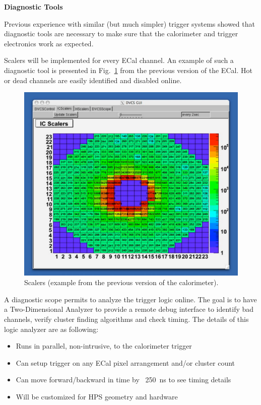 \vspace{1cm}
{\bf Diagnostic Tools}

Previous experience with similar (but much simpler) trigger systems showed that diagnostic tools are necessary to make sure that the calorimeter and trigger electronics work as expected. 

Scalers will be implemented for every ECal channel. An example of such a diagnostic tool is presented in Fig.~\ref{fig:dvcs_beam}
from the previous version of the ECal. Hot or dead channels are easily identified and disabled online.
\begin{figure}[h]
\includegraphics[scale=0.52]{daq_trigger/figures/dvcs_beam}
\caption{\small{Scalers (example from the previous version of the calorimeter).}}
\label{fig:dvcs_beam}
\end{figure}
A diagnostic scope permits to analyze the trigger logic online. The goal is to have a Two-Dimensional Analyzer
 to provide a remote debug interface to identify bad channels, verify cluster finding algorithms and check timing.
 The details of this logic analyzer are as following:
 
\begin{itemize}
\item Runs in parallel, non-intrusive, to the calorimeter trigger
\item Can setup trigger on any ECal pixel arrangement and/or cluster count
\item Can move forward/backward in time by ~250~ns to see timing details
\item Will be customized for HPS geometry and hardware
\end{itemize}

